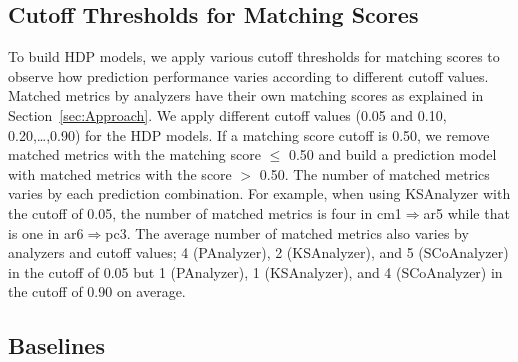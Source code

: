 % 

\subsection{Cutoff Thresholds for Matching Scores}

To build HDP models, we apply
various cutoff thresholds for matching scores to observe how prediction
performance varies according to different cutoff values. Matched metrics
by analyzers have their own matching scores as explained in
Section~\ref{sec:Approach}. We apply different cutoff values (0.05 and 0.10,
0.20,\ldots,0.90) for the HDP models. If a
matching score cutoff is 0.50, we remove matched metrics with the
matching score $\leq$ 0.50 and build a prediction model with matched metrics
with the score $>$ 0.50. The number of matched metrics varies by each prediction
combination. For example, when using KSAnalyzer with the cutoff of 0.05, the
number of matched metrics is four in cm1$\Rightarrow$ar5 while that is one in
ar6$\Rightarrow$pc3. The average number of matched metrics also varies by
analyzers and cutoff values; 4 (PAnalyzer), 2 (KSAnalyzer), and 5 (SCoAnalyzer)
in the cutoff of 0.05 but 1 (PAnalyzer), 1 (KSAnalyzer), and 4 (SCoAnalyzer) in
the cutoff of 0.90 on average.

\subsection{Baselines}

